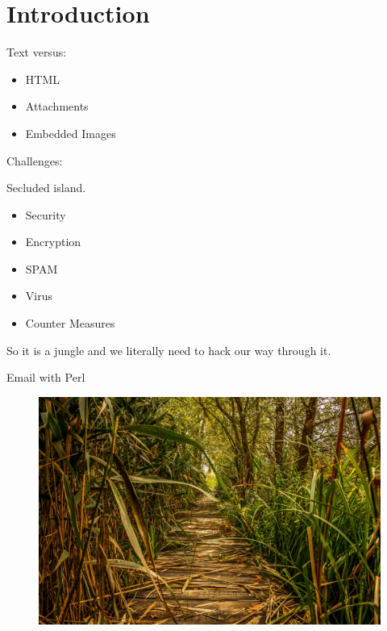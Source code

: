 \usepackage{minted}

\date{Nordic Perl Workshop 2018, Oslo, 6th September}


\maketitle

\begin{frame}
  \titlepage
\end{frame}

\cleardoublepage

\tableofcontents

\cleardoublepage

\section{Introduction}

Text versus:

\begin{itemize}
\item HTML
\item Attachments
\item Embedded Images
\end{itemize}

Challenges:

Secluded island.


\begin{itemize}
  \item Security
  \item Encryption
  \item SPAM
  \item Virus
  \item Counter Measures
\end{itemize}

So it is a jungle and we literally need to hack our way through it.

\begin{frame}{Email with Perl}
  \begin{figure}[!ht]
    \centering
    \includegraphics[width=0.9\linewidth]{img/swamp-1706114_1920.jpg}
  \end{figure}
\end{frame}

